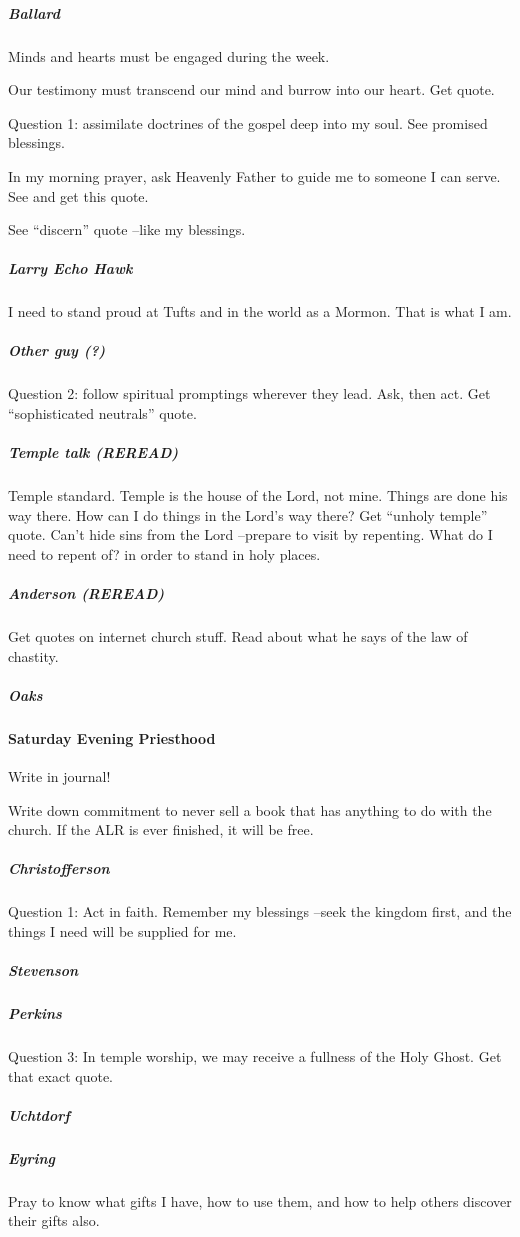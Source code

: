 \subparagraph*{Ballard} Minds and hearts must be engaged during the week.

Our testimony must transcend our mind and burrow into our heart. Get quote.

Question 1: assimilate doctrines of the gospel deep into my soul. See promised blessings.

In my morning prayer, ask Heavenly Father to guide me to someone I can serve. See and get this quote.

See ``discern'' quote --like my blessings.

\subparagraph*{Larry Echo Hawk} I need to stand proud at Tufts and in the world as a Mormon. That is what I am.

\subparagraph*{Other guy (?)} Question 2: follow spiritual promptings wherever they lead. Ask, then act. Get ``sophisticated neutrals'' quote.

\subparagraph*{Temple talk (REREAD)} Temple standard. Temple is the house of the Lord, not mine. Things are done his way there. How can I do things in the Lord's way there? Get ``unholy temple'' quote. Can't hide sins from the Lord --prepare to visit by repenting. What do I need to repent of? in order to stand in holy places.

\subparagraph*{Anderson (REREAD)} Get quotes on internet church stuff. Read about what he says of the law of chastity.

\subparagraph*{Oaks}

\paragraph*{Saturday Evening Priesthood}

Write in journal!

Write down commitment to never sell a book that has anything to do with the church. If the ALR is ever finished, it will be free.

\subparagraph*{Christofferson} Question 1: Act in faith. Remember my blessings --seek the kingdom first, and the things I need will be supplied for me.

\subparagraph*{Stevenson}

\subparagraph*{Perkins} Question 3: In temple worship, we may receive a fullness of the Holy Ghost. Get that exact quote.

\subparagraph*{Uchtdorf}

\subparagraph*{Eyring} Pray to know what gifts I have, how to use them, and how to help others discover their gifts also.


